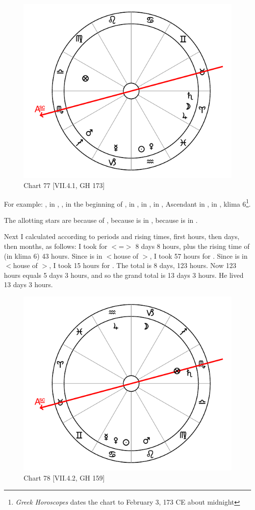 \begin{figure}
\centering
\vspace{-10pt}
\includegraphics[width=.68\textwidth]{charts/7_4_1}
\caption{Chart 77 [VII.4.1, GH 173]}
\label{fig:chart77}
\end{figure} 

\noindent For example: \Sun, \Venus\xspace in \Aquarius, \Moon, \Jupiter\xspace in the beginning of \Aries, \Saturn\xspace in \Aries, \Mars\xspace in \Sagittarius, \Mercury\xspace in \Capricorn, Ascendant in \Scorpio, \Fortune in \Libra, klima 6\footnote{\textit{Greek Horoscopes} dates the chart to February 3, 173 CE about midnight}. 

\noindent The allotting stars are \Venus\xspace because of \Libra, \Saturn\xspace because \Venus\xspace is in \Aquarius, \Mars\xspace because \Saturn\xspace is in \Aries. 

\noindent Next I calculated according to periods and rising times, first hours, then days, then months, as follows: I took for \Libra\xspace $<$=\Venus$>$ 8 days 8 hours, plus the rising time of \Libra (in klima 6) 43 hours. Since \Venus\xspace is in \Aquarius\xspace $<$house of \Saturn$>$, I took 57 hours for \Saturn. Since \Saturn\xspace is in \Aries\xspace $<$house of \Mars$>$, I took 15 hours for \Mars. The total is 8 days, 123 hours. Now 123 hours equals 5 days 3 hours, and so the grand total is 13 days 3 hours. He lived 13 days 3 hours.

\begin{figure}
\centering
\vspace{-10pt}
\includegraphics[width=.68\textwidth]{charts/7_4_2}
\caption{Chart 78 [VII.4.2, GH 159]}
\label{fig:chart78}
\end{figure} 

